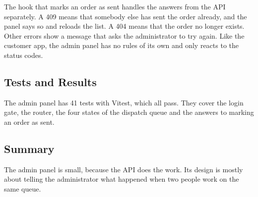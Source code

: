 The hook that marks an order as sent handles the answers from the API separately. A 409
means that somebody else has sent the order already, and the panel says so and reloads
the list. A 404 means that the order no longer exists. Other errors show a message that
asks the administrator to try again. Like the customer app, the admin panel has no rules
of its own and only reacts to the status codes.

\subsection{Tests and Results}

The admin panel has 41 tests with Vitest, which all pass. They cover the login gate, the
router, the four states of the dispatch queue and the answers to marking an order as sent.

\subsection{Summary}

The admin panel is small, because the API does the work. Its design is mostly about
telling the administrator what happened when two people work on the same queue.
